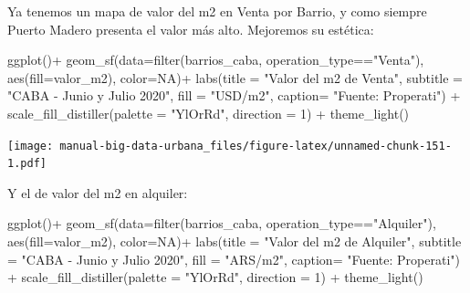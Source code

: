 \documentclass[
  spanish,
]{book}
\newenvironment{Shaded}{\begin{snugshade}}{\end{snugshade}}
\newcommand{\AttributeTok}[1]{\textcolor[rgb]{0.77,0.63,0.00}{#1}}
\newcommand{\ConstantTok}[1]{\textcolor[rgb]{0.00,0.00,0.00}{#1}}
\newcommand{\DecValTok}[1]{\textcolor[rgb]{0.00,0.00,0.81}{#1}}
\newcommand{\FunctionTok}[1]{\textcolor[rgb]{0.00,0.00,0.00}{#1}}
\newcommand{\NormalTok}[1]{#1}
\newcommand{\SpecialCharTok}[1]{\textcolor[rgb]{0.00,0.00,0.00}{#1}}
\newcommand{\StringTok}[1]{\textcolor[rgb]{0.31,0.60,0.02}{#1}}
\begin{document}
Ya tenemos un mapa de valor del m2 en Venta por Barrio, y como siempre Puerto Madero presenta el valor más alto. Mejoremos su estética:

\begin{Shaded}
\begin{Highlighting}[]
\FunctionTok{ggplot}\NormalTok{()}\SpecialCharTok{+}
  \FunctionTok{geom\_sf}\NormalTok{(}\AttributeTok{data=}\FunctionTok{filter}\NormalTok{(barrios\_caba, operation\_type}\SpecialCharTok{==}\StringTok{"Venta"}\NormalTok{), }\FunctionTok{aes}\NormalTok{(}\AttributeTok{fill=}\NormalTok{valor\_m2), }\AttributeTok{color=}\ConstantTok{NA}\NormalTok{)}\SpecialCharTok{+}
    \FunctionTok{labs}\NormalTok{(}\AttributeTok{title =} \StringTok{"Valor del m2 de Venta"}\NormalTok{,}
         \AttributeTok{subtitle =} \StringTok{"CABA {-} Junio y Julio 2020"}\NormalTok{,}
         \AttributeTok{fill =} \StringTok{"USD/m2"}\NormalTok{,}
         \AttributeTok{caption=} \StringTok{"Fuente: Properati"}\NormalTok{) }\SpecialCharTok{+}
  \FunctionTok{scale\_fill\_distiller}\NormalTok{(}\AttributeTok{palette =} \StringTok{"YlOrRd"}\NormalTok{, }\AttributeTok{direction =} \DecValTok{1}\NormalTok{) }\SpecialCharTok{+}
  \FunctionTok{theme\_light}\NormalTok{()}
\end{Highlighting}
\end{Shaded}

\texttt{[image: manual-big-data-urbana\_files/figure-latex/unnamed-chunk-151-1.pdf]}

Y el de valor del m2 en alquiler:

\begin{Shaded}
\begin{Highlighting}[]
\FunctionTok{ggplot}\NormalTok{()}\SpecialCharTok{+}
  \FunctionTok{geom\_sf}\NormalTok{(}\AttributeTok{data=}\FunctionTok{filter}\NormalTok{(barrios\_caba, operation\_type}\SpecialCharTok{==}\StringTok{"Alquiler"}\NormalTok{), }\FunctionTok{aes}\NormalTok{(}\AttributeTok{fill=}\NormalTok{valor\_m2), }\AttributeTok{color=}\ConstantTok{NA}\NormalTok{)}\SpecialCharTok{+}
    \FunctionTok{labs}\NormalTok{(}\AttributeTok{title =} \StringTok{"Valor del m2 de Alquiler"}\NormalTok{,}
         \AttributeTok{subtitle =} \StringTok{"CABA {-} Junio y Julio 2020"}\NormalTok{,}
         \AttributeTok{fill =} \StringTok{"ARS/m2"}\NormalTok{,}
         \AttributeTok{caption=} \StringTok{"Fuente: Properati"}\NormalTok{) }\SpecialCharTok{+}
  \FunctionTok{scale\_fill\_distiller}\NormalTok{(}\AttributeTok{palette =} \StringTok{"YlOrRd"}\NormalTok{, }\AttributeTok{direction =} \DecValTok{1}\NormalTok{) }\SpecialCharTok{+}
  \FunctionTok{theme\_light}\NormalTok{()}
\end{Highlighting}
\end{Shaded}
\end{document}

